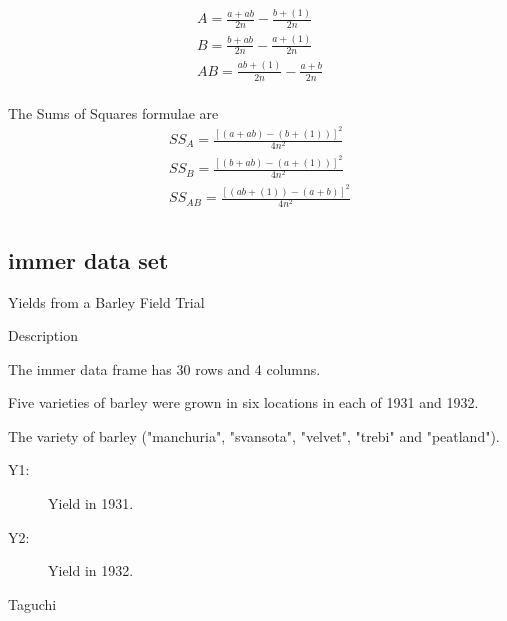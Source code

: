 \documentclass[]{article}
\begin{document}
\begin{eqnarray}
A = \frac{a+ab}{2n} -  \frac{b + (1)}{2n}\\
B = \frac{b+ab}{2n} -  \frac{a + (1)}{2n}\\
AB = \frac{ab + (1)}{2n} -  \frac{a + b}{2n}\\
\end{eqnarray}

The Sums of Squares formulae are
\begin{eqnarray}
SS_{A} = \frac{[(a + ab)-(b + (1))]^2}{4n^2}\\
SS_{B} = \frac{[(b + ab)-(a + (1))]^2}{4n^2}\\
SS_{AB} = \frac{[(ab + (1))-(a + b)]^2}{4n^2}\\
\end{eqnarray}



\subsection{immer data set}


Yields from a Barley Field Trial

Description


The immer data frame has 30 rows and 4 columns. 

Five varieties of barley were grown in six locations in each of 1931 and 1932.


The variety of barley ("manchuria", "svansota", "velvet", "trebi" and "peatland").

\begin{description}
\item[Y1:]    Yield in 1931.

\item[Y2:]    Yield in 1932.
\end{description}

Taguchi


\end{document}
